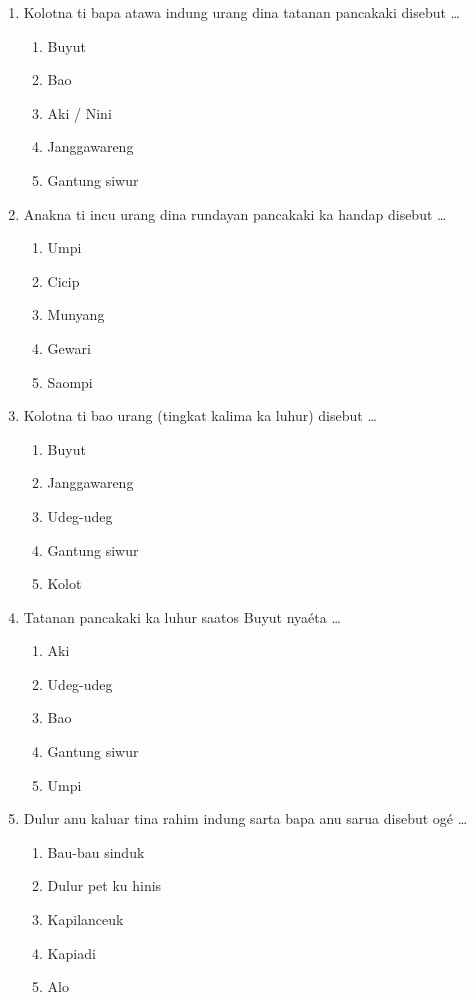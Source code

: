 \documentclass[12pt,a4paper]{article}
\begin{document}
\begin{enumerate}[leftmargin=*]
\item Kolotna ti bapa atawa indung urang dina tatanan pancakaki disebut \dots
    \begin{enumerate}[label=\alph*.]
        \item Buyut
        \item Bao
        \item Aki / Nini
        \item Janggawareng
        \item Gantung siwur
    \end{enumerate}

\item Anakna ti incu urang dina rundayan pancakaki ka handap disebut \dots
    \begin{enumerate}[label=\alph*.]
        \item Umpi
        \item Cicip
        \item Munyang
        \item Gewari
        \item Saompi
    \end{enumerate}

\item Kolotna ti bao urang (tingkat kalima ka luhur) disebut \dots
    \begin{enumerate}[label=\alph*.]
        \item Buyut
        \item Janggawareng
        \item Udeg-udeg
        \item Gantung siwur
        \item Kolot
    \end{enumerate}

\item Tatanan pancakaki ka luhur saatos Buyut nyaéta \dots
    \begin{enumerate}[label=\alph*.]
        \item Aki
        \item Udeg-udeg
        \item Bao
        \item Gantung siwur
        \item Umpi
    \end{enumerate}

\item Dulur anu kaluar tina rahim indung sarta bapa anu sarua disebut ogé \dots
    \begin{enumerate}[label=\alph*.]
        \item Bau-bau sinduk
        \item Dulur pet ku hinis
        \item Kapilanceuk
        \item Kapiadi
        \item Alo
    \end{enumerate}


\end{enumerate}
\end{document}
